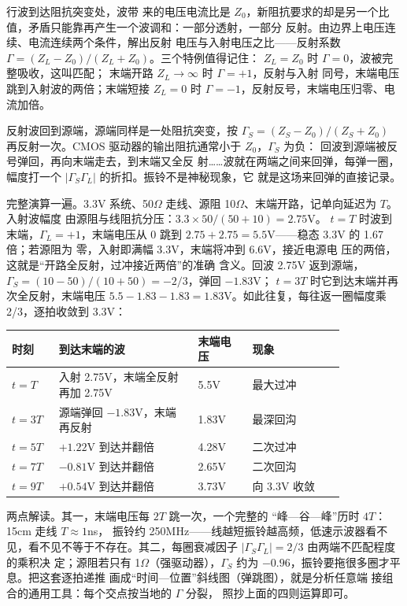 行波到达阻抗突变处，波带
来的电压电流比是 $Z_0$，新阻抗要求的却是另一个比
值，矛盾只能靠再产生一个波调和：一部分透射，一部分
反射。由边界上电压连续、电流连续两个条件，解出反射
电压与入射电压之比——反射系数
$\Gamma=(Z_L-Z_0)/(Z_L+Z_0)$。三个特例值得记住：
$Z_L=Z_0$ 时 $\Gamma=0$，波被完整吸收，这叫匹配；
末端开路 $Z_L\to\infty$ 时 $\Gamma=+1$，反射与入射
同号，末端电压跳到入射波的两倍；末端短接 $Z_L=0$
时 $\Gamma=-1$，反射反号，末端电压归零、电流加倍。

反射波回到源端，源端同样是一处阻抗突变，按
$\Gamma_S=(Z_S-Z_0)/(Z_S+Z_0)$ 再反射一次。CMOS
驱动器的输出阻抗通常小于 $Z_0$，$\Gamma_S$ 为负：
回波到源端被反号弹回，再向末端走去，到末端又全反
射……波就在两端之间来回弹，每弹一圈，幅度打一个
$|\Gamma_S\Gamma_L|$ 的折扣。振铃不是神秘现象，它
就是这场来回弹的直接记录。

完整演算一遍。3.3V 系统、50$\Omega$ 走线、源阻
10$\Omega$、末端开路，记单向延迟为 $T$。入射波幅度
由源阻与线阻抗分压：$3.3\times50/(50+10)=2.75$V。
$t=T$ 时波到末端，$\Gamma_L=+1$，末端电压从 0 跳到
$2.75+2.75=5.5$V——稳态 3.3V 的 1.67 倍；若源阻为
零，入射即满幅 3.3V，末端将冲到 6.6V，接近电源电
压的两倍，这就是“开路全反射，过冲接近两倍”的准确
含义。回波 2.75V 返到源端，
$\Gamma_S=(10-50)/(10+50)=-2/3$，弹回 $-1.83$V；
$t=3T$ 时它到达末端并再次全反射，末端电压
$5.5-1.83-1.83=1.83$V。如此往复，每往返一圈幅度乘
2/3，逐拍收敛到 3.3V：

\begin{longtable}{L{0.1\linewidth}L{0.36\linewidth}L{0.14\linewidth}L{0.24\linewidth}}
\toprule
时刻 & 到达末端的波 & 末端电压 & 现象 \\
\midrule
$t=T$ & 入射 2.75V，末端全反射再加 2.75V & 5.5V & 最大过冲 \\
$t=3T$ & 源端弹回 $-1.83$V，末端再反射 & 1.83V & 最深回沟 \\
$t=5T$ & $+1.22$V 到达并翻倍 & 4.28V & 二次过冲 \\
$t=7T$ & $-0.81$V 到达并翻倍 & 2.65V & 二次回沟 \\
$t=9T$ & $+0.54$V 到达并翻倍 & 3.73V & 向 3.3V 收敛 \\
\bottomrule
\end{longtable}

两点解读。其一，末端电压每 $2T$ 跳一次，一个完整的
“峰—谷—峰”历时 $4T$：15cm 走线 $T\approx1$ns，
振铃约 250MHz——线越短振铃越高频，低速示波器看不
见，看不见不等于不存在。其二，每圈衰减因子
$|\Gamma_S\Gamma_L|=2/3$ 由两端不匹配程度的乘积决
定；源阻若只有 1$\Omega$（强驱动器），$\Gamma_S$
约为 $-0.96$，振铃要拖很多圈才平息。把这套逐拍递推
画成“时间—位置”斜线图（弹跳图），就是分析任意端
接组合的通用工具：每个交点按当地的 $\Gamma$ 分裂，
照抄上面的四则运算即可。

